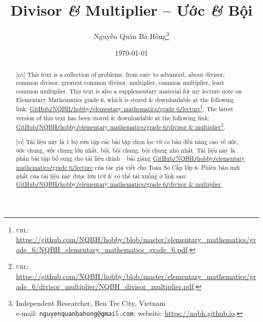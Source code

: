\documentclass{article}
\title{Divisor \textit{\&} Multiplier -- Ước \textit{\&} Bội}
\author{Nguyễn Quản Bá Hồng\footnote{Independent Researcher, Ben Tre City, Vietnam\\e-mail: \texttt{nguyenquanbahong@gmail.com}; website: \url{https://nqbh.github.io}.}}
\date{\today}
\numberwithin{equation}{section}
\begin{document}
\maketitle
\begin{abstract}
	\textsc{[en]} This text is a collection of problems, from easy to advanced, about divisor, common divisor, greatest common divisor, multiplier, common multiplier, least common multiplier. This text is also a supplementary material for my lecture note on Elementary Mathematics grade 6, which is stored \& downloadable at the following link: \href{https://github.com/NQBH/hobby/blob/master/elementary_mathematics/grade_6/NQBH_elementary_mathematics_grade_6.pdf}{GitHub\texttt{/}NQBH\texttt{/}hobby\texttt{/}elementary mathematics\texttt{/}grade 6\texttt{/}lecture}\footnote{\textsc{url}: \url{https://github.com/NQBH/hobby/blob/master/elementary_mathematics/grade_6/NQBH_elementary_mathematics_grade_6.pdf}.}. The latest version of this text has been stored \& downloadable at the following link: \href{https://github.com/NQBH/hobby/blob/master/elementary_mathematics/grade_6/divisor_multiplier/NQBH_divisor_multiplier.pdf}{GitHub\texttt{/}NQBH\texttt{/}hobby\texttt{/}elementary mathematics\texttt{/}grade 6\texttt{/}divisor \& multiplier}\footnote{\textsc{url}: \url{https://github.com/NQBH/hobby/blob/master/elementary_mathematics/grade_6/divisor_multiplier/NQBH_divisor_multiplier.pdf}.}.
	\vspace{2mm}
	
	\textsc{[vi]} Tài liệu này là 1 bộ sưu tập các bài tập chọn lọc từ cơ bản đến nâng cao về ước, ước chung, ước chung lớn nhất, bội, bội chung, bội chung nhỏ nhất. Tài liệu này là phần bài tập bổ sung cho tài liệu chính -- bài giảng \href{https://github.com/NQBH/hobby/blob/master/elementary_mathematics/grade_6/NQBH_elementary_mathematics_grade_6.pdf}{GitHub\texttt{/}NQBH\texttt{/}hobby\texttt{/}elementary mathematics\texttt{/}grade 6\texttt{/}lecture} của tác giả viết cho Toán Sơ Cấp lớp 6. Phiên bản mới nhất của tài liệu này được lưu trữ \& có thể tải xuống ở link sau: \href{https://github.com/NQBH/hobby/blob/master/elementary_mathematics/grade_6/divisor_multiplier/NQBH_divisor_multiplier.pdf}{GitHub\texttt{/}NQBH\texttt{/}hobby\texttt{/}elementary mathematics\texttt{/}grade 6\texttt{/}divisor \& multiplier}.
\end{abstract}
\setcounter{secnumdepth}{4}
\setcounter{tocdepth}{3}
\tableofcontents
\newpage

\end{document}
